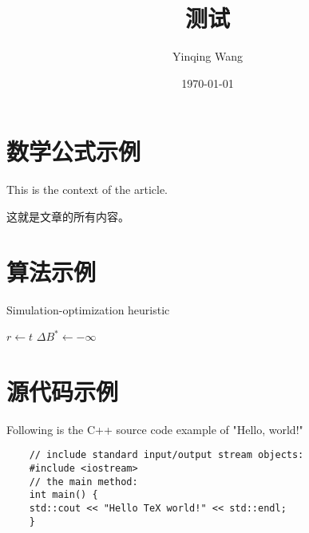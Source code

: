 \documentclass[UTF8]{ctexart}
\title{测试}
\author{Yinqing Wang}
\date{\today}
\begin{document}
\maketitle
 
\section{数学公式示例}
This is the context of the article.
 
这就是文章的所有内容。

\section{算法示例}

\begin{algorithm}
    \DontPrintSemicolon
    \SetAlgoLined

    \caption{Simulation-optimization heuristic}\label{algorithm}  
    $r\leftarrow t$\;  
    $\Delta B^{\ast}\leftarrow -\infty$\;  
\end{algorithm}  
    

\section{源代码示例}

Following is the C++ source code example of "Hello, world!"

\begin{lstlisting}
    // include standard input/output stream objects:
    #include <iostream>
    // the main method:
    int main() {
    std::cout << "Hello TeX world!" << std::endl;
    }
\end{lstlisting}
\end{document}
